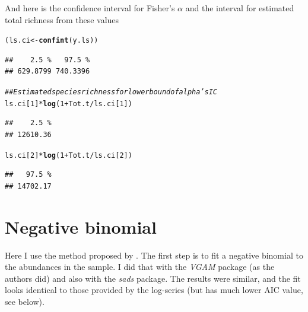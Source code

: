 \documentclass[12pt, A4]{article}\usepackage[]{graphicx}\usepackage[]{color}
\makeatletter
\newcommand{\hlnum}[1]{\textcolor[rgb]{0.686,0.059,0.569}{#1}}%
\newcommand{\hlcom}[1]{\textcolor[rgb]{0.678,0.584,0.686}{\textit{#1}}}%
\newcommand{\hlopt}[1]{\textcolor[rgb]{0,0,0}{#1}}%
\newcommand{\hlstd}[1]{\textcolor[rgb]{0.345,0.345,0.345}{#1}}%
\newcommand{\hlkwb}[1]{\textcolor[rgb]{0.69,0.353,0.396}{#1}}%
\newcommand{\hlkwd}[1]{\textcolor[rgb]{0.737,0.353,0.396}{\textbf{#1}}}%
\newenvironment{kframe}{%
 \def\at@end@of@kframe{}%
 \ifinner\ifhmode%
  \def\at@end@of@kframe{\end{minipage}}%
  \begin{minipage}{\columnwidth}%
 \fi\fi%
 \def\FrameCommand##1{\hskip\@totalleftmargin \hskip-\fboxsep
 \colorbox{shadecolor}{##1}\hskip-\fboxsep
     \hskip-\linewidth \hskip-\@totalleftmargin \hskip\columnwidth}%
 \MakeFramed {\advance\hsize-\width
   \@totalleftmargin\z@ \linewidth\hsize
   \@setminipage}}%
 {\par\unskip\endMakeFramed%
 \at@end@of@kframe}
\newenvironment{knitrout}{}{} %
\makeatother
\begin{document}
And here is the confidence interval for Fisher's $\alpha$ and the
interval for estimated total richness from these values

\begin{knitrout}
\color{fgcolor}\begin{kframe}
\begin{alltt}
\hlstd{(ls.ci} \hlkwb{<-} \hlkwd{confint}\hlstd{(y.ls))}
\end{alltt}
\begin{verbatim}
##    2.5 %   97.5 % 
## 629.8799 740.3396
\end{verbatim}
\begin{alltt}
\hlcom{## Estimated species richness for lower bound of alpha's IC}
\hlstd{ls.ci[}\hlnum{1}\hlstd{]}\hlopt{*}\hlkwd{log}\hlstd{(}\hlnum{1} \hlopt{+} \hlstd{Tot.t}\hlopt{/}\hlstd{ls.ci[}\hlnum{1}\hlstd{])}
\end{alltt}
\begin{verbatim}
##    2.5 % 
## 12610.36
\end{verbatim}
\begin{alltt}
\hlstd{ls.ci[}\hlnum{2}\hlstd{]}\hlopt{*}\hlkwd{log}\hlstd{(}\hlnum{1} \hlopt{+} \hlstd{Tot.t}\hlopt{/}\hlstd{ls.ci[}\hlnum{2}\hlstd{])}
\end{alltt}
\begin{verbatim}
##   97.5 % 
## 14702.17
\end{verbatim}
\end{kframe}
\end{knitrout}

\section*{Negative binomial}

Here I use the method proposed by \citet{tovo2017}. The first step is
to fit a negative binomial to the abundances in the sample.
I did that with the \emph{VGAM} package (as the authors did)
and also with the \emph{sads} package. 
The results were similar, and the fit looks identical to
those provided by the log-series (but has much lower AIC value, see below).
\end{document}
